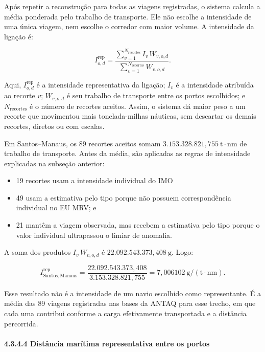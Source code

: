 \documentclass[brazil,]{article}
\providecommand{\tightlist}{%
  \setlength{\itemsep}{0pt}\setlength{\parskip}{0pt}}
\let\oldparagraph\paragraph
\renewcommand{\paragraph}[1]{\Needspace{7\baselineskip}\oldparagraph{#1}\mbox{}}
\begin{document}
Após repetir a reconstrução para todas as viagens registradas, o sistema
calcula a média ponderada pelo trabalho de transporte. Ele não escolhe a
intensidade de uma única viagem, nem escolhe o corredor com maior
volume. A intensidade da ligação é:

\[
I_{o,d}^{\mathrm{rep}}=
\frac{\sum_{v=1}^{N_{\mathrm{recortes}}}I_v\,W_{v,o,d}}
{\sum_{v=1}^{N_{\mathrm{recortes}}}W_{v,o,d}}.
\]

Aqui, \(I_{o,d}^{\mathrm{rep}}\) é a intensidade representativa da
ligação; \(I_v\) é a intensidade atribuída ao recorte \(v\);
\(W_{v,o,d}\) é seu trabalho de transporte entre os portos escolhidos; e
\(N_{\mathrm{recortes}}\) é o número de recortes aceitos. Assim, o
sistema dá maior peso a um recorte que movimentou mais tonelada-milhas
náuticas, sem descartar os demais recortes, diretos ou com escalas.

Em Santos--Manaus, os 89 recortes aceitos somam
\(3.153.328.821{,}755\ \mathrm{t\cdot nm}\) de trabalho de transporte.
Antes da média, são aplicadas as regras de intensidade explicadas na
subseção anterior:

\begin{itemize}
\tightlist
\item
  19 recortes usam a intensidade individual do IMO
\item
  49 usam a estimativa pelo tipo porque não possuem correspondência
  individual no EU MRV; e
\item
  21 mantêm a viagem observada, mas recebem a estimativa pelo tipo
  porque o valor individual ultrapassou o limiar de anomalia.
\end{itemize}

A soma dos produtos \(I_v\,W_{v,o,d}\) é
\(22.092.543.373{,}408\ \mathrm{g}\). Logo:

\[
I_{\mathrm{Santos,Manaus}}^{\mathrm{rep}}=
\frac{22.092.543.373{,}408}
{3.153.328.821{,}755}
=7{,}006102\ \mathrm{g/(t\cdot nm)}.
\]

Esse resultado não é a intensidade de um navio escolhido como
representante. É a média das 89 viagens registradas nas bases da ANTAQ
para esse trecho, em que cada uma contribui conforme a carga
efetivamente transportada e a distância percorrida.

\hypertarget{distuxe2ncia-maruxedtima-representativa-entre-os-portos}{%
\paragraph{4.3.4.4 Distância marítima representativa entre os
portos}\label{distuxe2ncia-maruxedtima-representativa-entre-os-portos}}
\end{document}
